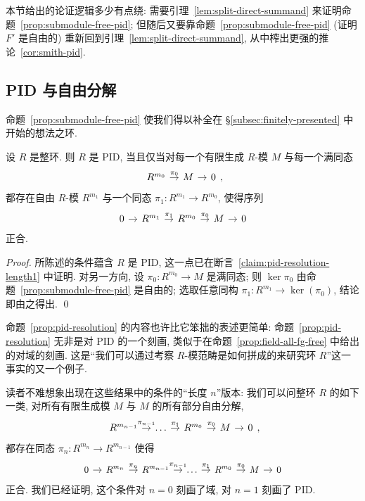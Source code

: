本节给出的论证逻辑多少有点绕: 需要引理~\ref{lem:split-direct-summand} 来证明命题~\ref{prop:submodule-free-pid}; 但随后又要靠命题~\ref{prop:submodule-free-pid} (证明 $F'$ 是自由的) 重新回到引理~\ref{lem:split-direct-summand}, 从中榨出更强的推论~\ref{cor:smith-pid}.

\subsection{PID 与自由分解}\label{subsec:pids-resolutions}

命题~\ref{prop:submodule-free-pid} 使我们得以补全在 §\ref{subsec:finitely-presented} 中开始的想法之环.

\begin{proposition}\label{prop:pid-resolution}
设 $R$ 是整环. 则 $R$ 是 PID, 当且仅当对每一个有限生成 $R$-模 $M$ 与每一个满同态
$$
\begin{tikzcd}[column sep=.9em]
R^{m_0} \ar[r,"\pi_0"] & M \ar[r] & 0
\end{tikzcd},
$$
都存在自由 $R$-模 $R^{m_1}$ 与一个同态 $\pi_1:R^{m_1}\to R^{m_0}$, 使得序列
$$
\begin{tikzcd}[column sep=.9em]
0 \ar[r] & R^{m_1} \ar[r,"\pi_1"] & R^{m_0} \ar[r,"\pi_0"] & M \ar[r] & 0
\end{tikzcd}
$$
正合.
\end{proposition}

\begin{proof}
所陈述的条件蕴含 $R$ 是 PID, 这一点已在断言~\ref{claim:pid-resolution-length1} 中证明. 对另一方向, 设 $\pi_0:R^{m_0}\to M$ 是满同态; 则 $\ker\pi_0$ 由命题~\ref{prop:submodule-free-pid} 是自由的; 选取任意同构 $\pi_1:R^{m_1}\to\ker(\pi_0)$, 结论即由之得出. \qed
\end{proof}

命题~\ref{prop:pid-resolution} 的内容也许比它笨拙的表述更简单: 命题~\ref{prop:pid-resolution} 无非是对 PID 的一个刻画, 类似于在命题~\ref{prop:field-all-fg-free} 中给出的对域的刻画. 这是``我们可以通过考察 $R$-模范畴是如何拼成的来研究环 $R$''这一事实的又一个例子.

读者不难想象出现在这些结果中的条件的``长度 $n$''版本: 我们可以问整环 $R$ 的如下一类, 对所有有限生成模 $M$ 与 $M$ 的所有部分自由分解,
$$
\begin{tikzcd}[column sep=.9em]
R^{m_{n-1}} \ar[r,"\pi_{n-1}"] & \dots \ar[r,"\pi_1"] & R^{m_0} \ar[r,"\pi_0"] & M \ar[r] & 0
\end{tikzcd},
$$
都存在同态 $\pi_n:R^{m_n}\to R^{m_{n-1}}$ 使得
$$
\begin{tikzcd}[column sep=.9em,font=\small]
0 \ar[r] & R^{m_n} \ar[r,"\pi_n"] & R^{m_{n-1}} \ar[r,"\pi_{n-1}"] & \dots \ar[r,"\pi_1"] & R^{m_0} \ar[r,"\pi_0"] & M \ar[r] & 0
\end{tikzcd}
$$
正合. 我们已经证明, 这个条件对 $n=0$ 刻画了域, 对 $n=1$ 刻画了 PID.

